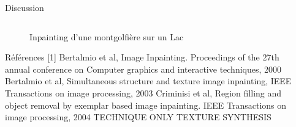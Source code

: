 \documentclass[final,hyperref={pdfpagelabels=false}]{beamer}
\begin{document}
\begin{frame}[t]
\begin{columns}[t]
\begin{column}{.930\textwidth}
\begin{block}{\Large Discussion}
\begin{columns}[t]
\begin{column}{.496\textwidth}
\begin{figure}[H]
\centering
{}
\caption{Inpainting d'une montgolfière sur un Lac}
\end{figure}

\begin{block}{Références}
[1] Bertalmio et al, Image Inpainting. Proceedings of the 27th annual conference on Computer graphics and interactive techniques, 2000 \hfill \break 
[2] Bertalmio et al, Simultaneous structure and texture image inpainting, IEEE Transactions on image processing, 2003 \hfill \break
[3] Criminisi et al, Region filling and object removal by exemplar based image inpainting. IEEE Transactions on image processing, 2004 \hfill \break
[4] \alert TECHNIQUE ONLY TEXTURE SYNTHESIS

\end{block}
\end{column}
\end{columns}
\end{block}
\end{column}
\begin{column}{.02\textwidth} \end{column}
\end{columns}

\end{frame}

\end{document}
